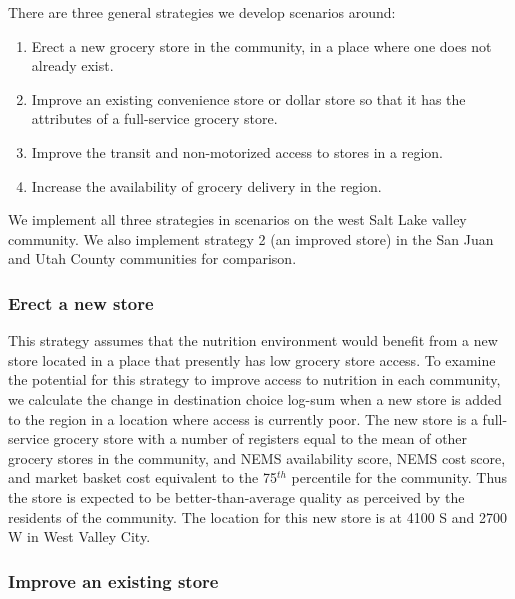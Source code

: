 \documentclass[
  letterpaper,
  number,
  review,
  doubleblind,
  3p]{elsarticle}
\providecommand{\tightlist}{%
  \setlength{\itemsep}{0pt}\setlength{\parskip}{0pt}}\usepackage{longtable,booktabs,array}
\begin{document}
There are three general strategies we develop scenarios around:

\begin{enumerate}
\def\labelenumi{\arabic{enumi}.}
\tightlist
\item
  Erect a new grocery store in the community, in a place where one does
  not already exist.
\item
  Improve an existing convenience store or dollar store so that it has
  the attributes of a full-service grocery store.
\item
  Improve the transit and non-motorized access to stores in a region.
\item
  Increase the availability of grocery delivery in the region.
\end{enumerate}

We implement all three strategies in scenarios on the west Salt Lake
valley community. We also implement strategy 2 (an improved store) in
the San Juan and Utah County communities for comparison.

\subsubsection{Erect a new store}\label{erect-a-new-store}

This strategy assumes that the nutrition environment would benefit from
a new store located in a place that presently has low grocery store
access. To examine the potential for this strategy to improve access to
nutrition in each community, we calculate the change in destination
choice log-sum when a new store is added to the region in a location
where access is currently poor. The new store is a full-service grocery
store with a number of registers equal to the mean of other grocery
stores in the community, and NEMS availability score, NEMS cost score,
and market basket cost equivalent to the 75\(^{th}\) percentile for the
community. Thus the store is expected to be better-than-average quality
as perceived by the residents of the community. The location for this
new store is at 4100 S and 2700 W in West Valley City.

\subsubsection{Improve an existing
store}\label{improve-an-existing-store}
\end{document}
